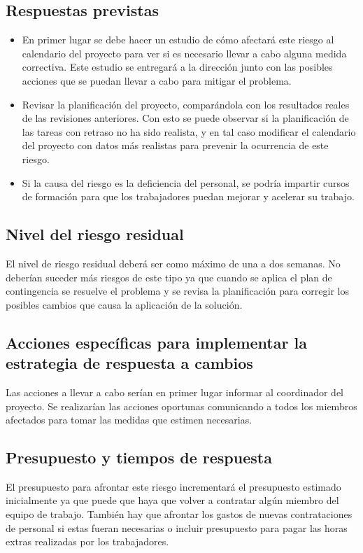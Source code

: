 \documentclass[11pt,a4paper,spanish,twoside]{report}
\begin{document}
\subsection{Respuestas previstas}
\begin{itemize}
\item En primer lugar se debe hacer un estudio de cómo afectará este riesgo
  al calendario del proyecto para ver si es necesario llevar a cabo alguna
  medida correctiva. Este estudio se entregará a la dirección junto con las
  posibles acciones que se puedan llevar a cabo para mitigar el problema. 
\item Revisar la planificación del proyecto, comparándola con los resultados
  reales de las revisiones anteriores. Con esto se puede observar si la
  planificación de las tareas con retraso no ha sido realista, y en tal caso
  modificar el calendario del proyecto con datos más realistas para prevenir
  la ocurrencia de este riesgo.
\item Si la causa del riesgo es la deficiencia del personal, se podría
  impartir cursos de formación para que los trabajadores puedan mejorar y
  acelerar su trabajo. 
\end{itemize}

\subsection{Nivel del riesgo residual}
El nivel de riesgo residual deberá ser como máximo de una a dos semanas. No
deberían suceder más riesgos de este tipo ya que cuando se aplica el plan de 
contingencia se resuelve el problema y se revisa la planificación para
corregir los posibles cambios que causa la aplicación de la solución. 

\subsection{Acciones específicas para implementar la estrategia de respuesta
a cambios}
Las acciones a llevar a cabo serían en primer lugar informar al coordinador
del proyecto. Se realizarían las acciones oportunas comunicando a todos los
miembros afectados para tomar las medidas que estimen necesarias. 

\subsection{Presupuesto y tiempos de respuesta}

El presupuesto para afrontar este riesgo incrementará el presupuesto estimado
inicialmente ya que puede que haya que volver a contratar algún miembro del
equipo de trabajo. También hay que afrontar los gastos de nuevas
contrataciones de personal si estas fueran necesarias o incluir presupuesto
para pagar las horas extras realizadas por los trabajadores. 
\end{document}
